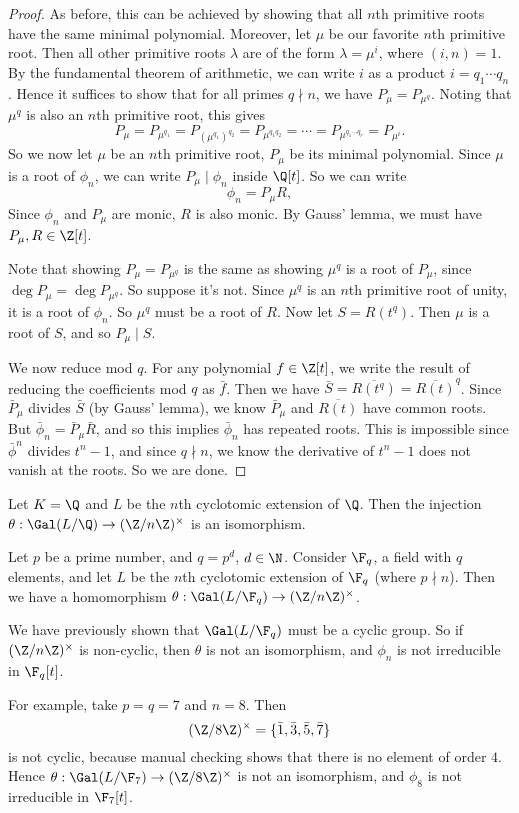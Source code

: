 \documentclass[a4paper]{article}
\begin{document}
\begin{proof}
  As before, this can be achieved by showing that all $n$th primitive roots have the same minimal polynomial. Moreover, let $\mu$ be our favorite $n$th primitive root. Then all other primitive roots $\lambda$ are of the form $\lambda = \mu^i$, where $(i, n) = 1$. By the fundamental theorem of arithmetic, we can write $i$ as a product $i = q_1 \cdots q_n$. Hence it suffices to show that for all primes $q \nmid n$, we have $P_{\mu} = P_{\mu^q}$. Noting that $\mu^q$ is also an $n$th primitive root, this gives
  \[
    P_{\mu} = P_{\mu^{q_1}} = P_{(\mu^{q_1})^{q_2}} = P_{\mu^{q_1q_2}} = \cdots = P_{\mu^{q_1\cdots q_r}} = P_{\mu^i}.
  \]
  So we now let $\mu$ be an $n$th primitive root, $P_\mu$ be its minimal polynomial. Since $\mu$ is a root of $\phi_n$, we can write $P_\mu \mid \phi_n$ inside $\Q[t]$. So we can write
  \[
    \phi_n = P_\mu R,
  \]
  Since $\phi_n$ and $P_\mu$ are monic, $R$ is also monic. By Gauss' lemma, we must have $P_\mu, R \in \Z[t]$.

  Note that showing $P_\mu = P_{\mu^q}$ is the same as showing $\mu^q$ is a root of $P_\mu$, since $\deg P_\mu = \deg P_{\mu^q}$. So suppose it's not. Since $\mu^q$ is an $n$th primitive root of unity, it is a root of $\phi_n$. So $\mu^q$ must be a root of $R$. Now let $S = R(t^q)$. Then $\mu$ is a root of $S$, and so $P_\mu \mid S$.

  We now reduce mod $q$. For any polynomial $f \in \Z[t]$, we write the result of reducing the coefficients mod $q$ as $\bar{f}$. Then we have $\bar{S} = \overline{R(t^q)} = \overline{R(t)}^q$. Since $\bar{P}_\mu$ divides $\bar{S}$ (by Gauss' lemma), we know $\bar{P}_\mu$ and $\overline{R(t)}$ have common roots. But $\bar{\phi}_n = \bar{P}_\mu \bar{R}$, and so this implies $\bar{\phi}_n$ has repeated roots. This is impossible since $\bar{\phi}^n$ divides $t^n - 1$, and since $q \nmid n$, we know the derivative of $t^n - 1$ does not vanish at the roots. So we are done.
\end{proof}

\begin{cor}
  Let $K = \Q$ and $L$ be the $n$th cyclotomic extension of $\Q$. Then the injection $\theta: \Gal(L/\Q) \to (\Z/n\Z)^\times$ is an isomorphism.
\end{cor}

\begin{eg}
  Let $p$ be a prime number, and $q = p^d$, $d \in \N$. Consider $\F_q$, a field with $q$ elements, and let $L$ be the $n$th cyclotomic extension of $\F_q$ (where $p\nmid n$). Then we have a homomorphism $\theta: \Gal(L/\F_q) \rightarrow (\Z/n\Z)^\times$.

  We have previously shown that $\Gal(L/\F_q)$ must be a cyclic group. So if $(\Z/n\Z)^\times$ is non-cyclic, then $\theta$ is not an isomorphism, and $\phi_n$ is not irreducible in $\F_q[t]$.

  For example, take $p = q = 7$ and $n = 8$. Then
  \[
    (\Z/8\Z)^\times = \{\bar{1}, \bar{3}, \bar{5}, \bar{7}\}
  \]
  is not cyclic, because manual checking shows that there is no element of order $4$. Hence $\theta: \Gal(L/\F_7) \to (\Z/8\Z)^\times$ is not an isomorphism, and $\phi_8$ is not irreducible in $\F_7[t]$.
\end{eg}
\end{document}

